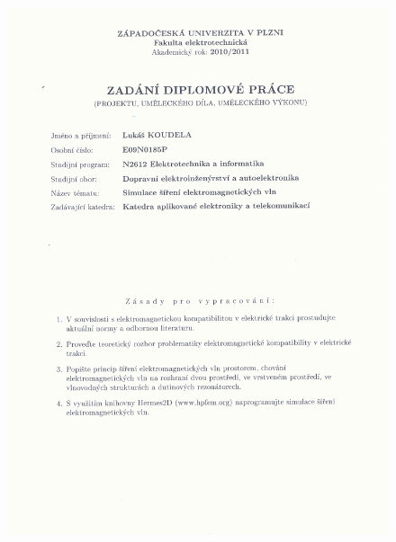 
\renewcommand\thepage{}
\begin{figure}[!h]
	\centering
	\includegraphics[width=15cm]{zadani1.png}
\end{figure}
\titlepage
